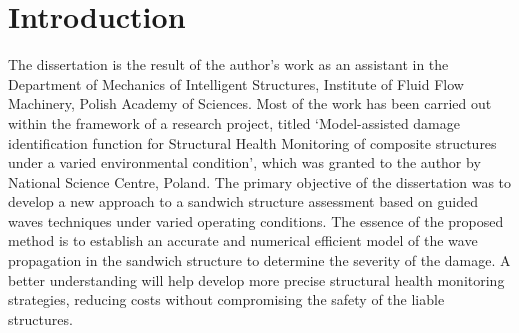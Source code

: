 

\chapter[Introduction]{Introduction}
\label{ch:intro}
The dissertation is the result of the author’s work as an assistant in the Department of Mechanics of Intelligent Structures, Institute of Fluid Flow Machinery, Polish Academy of Sciences.
Most of the work has been carried out within the framework of a research project, titled ‘Model-assisted damage identification function for Structural Health Monitoring of composite structures under a varied environmental condition', which was granted to the author by National Science Centre, Poland.
The primary objective of the dissertation was to develop a new approach to a sandwich structure assessment based on guided waves techniques under varied operating conditions.
The essence of the proposed method is to establish an accurate and numerical efficient model of the wave propagation in the sandwich structure to determine the severity of the damage.
A better understanding will help develop more precise structural health monitoring strategies, reducing costs without compromising the safety of the liable structures.






